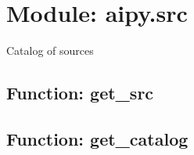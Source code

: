 \section{Module: aipy.src}

Catalog of sources

\subsection{Function: get\_src}

\subsection{Function: get\_catalog}

